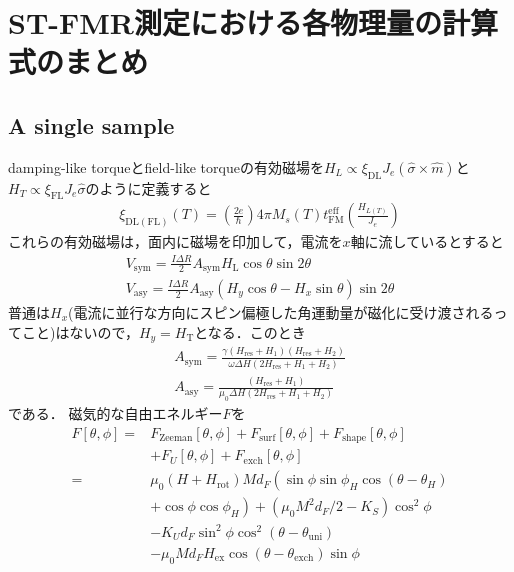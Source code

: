 \documentclass[11pt]{jbook}
\begin{document}
\chapter{ST-FMR測定における各物理量の計算式のまとめ}
\section{A single sample}

damping-like torqueとfield-like torqueの有効磁場を$H_{L} \propto \xi_{\mathrm{DL}} J_{e}(\hat{\sigma} \times \hat{m})$と$H_{T} \propto\xi_{\mathrm{FL}} J_{e} \hat{\sigma}$のように定義すると
\begin{eqnarray}
\xi_{\mathrm{DL}(\mathrm{FL})}(T)=\left(\frac{2 e}{\hbar}\right) 4 \pi M_{s}(T) t_{\mathrm{FM}}^{\mathrm{eff}}\left(\frac{H_{L(T)}}{J_{e}}\right)
\end{eqnarray}
これらの有効磁場は，面内に磁場を印加して，電流を$x$軸に流しているとすると~\cite{PhysRevB.92.214406}
\begin{eqnarray}
V_{\mathrm{sym}}=\frac{I \Delta R}{2} A_{\mathrm{sym}} H_\mathrm{L}\cos\theta \sin 2 \theta \\
V_{\mathrm{asy}}=\frac{I \Delta R}{2} A_{\mathrm{asy}}\left(H_{y} \cos \theta-H_{x} \sin \theta\right) \sin 2 \theta
\end{eqnarray}
普通は$H_x$(電流に並行な方向にスピン偏極した角運動量が磁化に受け渡されるってこと)はないので，$H_y = H_\mathrm{T}$となる．このとき
\begin{eqnarray}
A_{\mathrm{sym}}=\frac{\gamma\left(H_{\mathrm{res}}+H_{1}\right)\left(H_{\mathrm{res}}+H_{2}\right)}{\omega \Delta H\left(2 H_{\mathrm{res}}+H_{1}+H_{2}\right)} \\
A_{\mathrm{asy}}=\frac{\left(H_{\mathrm{res}}+H_{1}\right)}{\mu_{0} \Delta H\left(2 H_{\mathrm{res}}+H_{1}+H_{2}\right)}
\end{eqnarray}
である．
磁気的な自由エネルギー$F$を
\begin{eqnarray}
F[\theta, \phi]=&\nonumber F_{\mathrm{Zeeman}}[\theta, \phi]+F_{\mathrm{surf}}[\theta, \phi]+F_{\mathrm{shape}}[\theta, \phi] \\
&+F_{U}[\theta, \phi]+F_{\mathrm{exch}}[\theta, \phi] \\\nonumber
=& \mu_{0}\left(H+H_{\mathrm{rot}}\right) M d_{F}\left(\sin \phi \sin \phi_{H} \cos \left(\theta-\theta_{H}\right)\right.\\\nonumber
&\left.+\cos \phi \cos \phi_{H}\right)+\left(\mu_{0} M^{2} d_{F} / 2-K_{S}\right) \cos ^{2} \phi \\\nonumber
&-K_{U} d_{F} \sin ^{2} \phi \cos ^{2}\left(\theta-\theta_{\mathrm{uni}}\right) \\
&-\mu_{0} M d_{F} H_{\mathrm{ex}} \cos \left(\theta-\theta_{\mathrm{exch}}\right) \sin \phi
\end{eqnarray}
\end{document}
